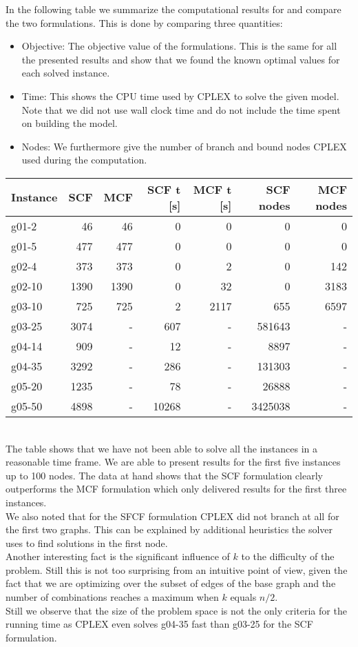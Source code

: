 \documentclass{article}
\begin{document}
In the following table we summarize the computational results for and compare the two formulations. This is done by comparing three quantities:
\begin{itemize}
	\item Objective: The objective value of the formulations. This is the same for all the presented results and show that we found the known optimal values for each solved instance.
	\item Time: This shows the CPU time used by CPLEX to solve the given model. Note that we did not use wall clock time and do not include the time spent on building the model.
	\item Nodes: We furthermore give the number of branch and bound nodes CPLEX used during the computation.
\end{itemize}
\begin{tabular}{ l r r r r r r}
	Instance & SCF  & MCF  & SCF t [s] & MCF t [s] & SCF nodes & MCF nodes \\ \midrule
	g01-2 & 46 & 46 & 0 & 0 & 0 & 0 \\
	g01-5 & 477 & 477 & 0 & 0 & 0 & 0 \\
	g02-4 & 373 & 373 & 0 & 2 & 0 & 142 \\
	g02-10 & 1390 & 1390 & 0 & 32 & 0 & 3183 \\
	g03-10 & 725 & 725 & 2 & 2117 & 655 & 6597 \\
	g03-25 & 3074 & - & 607 & - & 581643 & - \\
	g04-14 & 909 & - & 12 & - & 8897 & - \\
	g04-35 & 3292 & - & 286 & - & 131303 & - \\
	g05-20 & 1235 & - & 78 & - & 26888 & - \\
	g05-50 & 4898 & - & 10268 & - & 3425038 & - \\
\end{tabular}\\
The table shows that we have not been able to solve all the instances in a reasonable time frame. We are able to present results for the first five instances up to 100 nodes. The data at hand shows that the SCF formulation clearly outperforms the MCF formulation which only delivered results for the first three instances.\\
We also noted that for the SFCF formulation CPLEX did not branch at all for the first two graphs. This can be explained by additional heuristics the solver uses to find solutions in the first node.\\
Another interesting fact is the significant influence of $k$ to the difficulty of the problem. Still this is not too surprising from an intuitive point of view, given the fact that we are optimizing over the subset of edges of the base graph and the number of combinations reaches a maximum when $k$ equals $n/2$.\\
Still we observe that the size of the problem space is not the only criteria for the running time as CPLEX even solves g04-35 fast than g03-25 for the SCF formulation.
\end{document}

